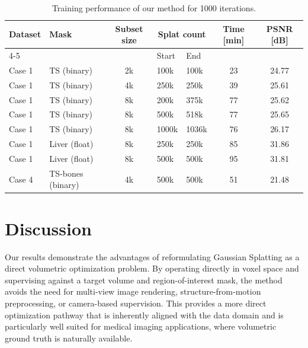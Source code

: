 \documentclass[runningheads]{llncs}
\begin{document}
\begin{table}
\centering
\caption{Training performance of our method for 1000 iterations.}\label{tab:training}
\setlength{\tabcolsep}{4pt}
\renewcommand{\arraystretch}{1.1}
\begin{tabular}{|l|l|c|l|l|c|c|}
\hline
Dataset & Mask & Subset size & \multicolumn{2}{c|}{Splat count} & Time [min] & PSNR [dB]\\
\cline{4-5}
 & & & Start & End & & \\
\hline
Case 1 & TS (binary)    & 2k  & 100k   & 100k  & 23 & 24.77 \\
Case 1 & TS (binary)    & 4k  & 250k   & 250k  & 39 & 25.61\\
Case 1 & TS (binary)    & 8k  & 200k   & 375k  & 77 & 25.62\\
Case 1 & TS (binary)    & 8k  & 500k   & 518k  & 77 & 25.65\\
Case 1 & TS (binary)    & 8k  & 1000k  & 1036k & 76 & 26.17\\
Case 1 & Liver (float)  & 8k  & 250k   & 250k  & 85 & 31.86\\
Case 1 & Liver (float)  & 8k  & 500k   & 500k  & 95 & 31.81\\
Case 4 & TS-bones (binary)  & 4k  & 500k   & 500k  & 51 & 21.48\\
\hline
\end{tabular}
\end{table}








\section{Discussion}

Our results demonstrate the advantages of reformulating Gaussian Splatting as a direct volumetric optimization problem. By operating directly in voxel space and supervising against a target volume and region-of-interest mask, the method avoids the need for multi-view image rendering, structure-from-motion preprocessing, or camera-based supervision. This provides a more direct optimization pathway that is inherently aligned with the data domain and is particularly well suited for medical imaging applications, where volumetric ground truth is naturally available.
\end{document}
